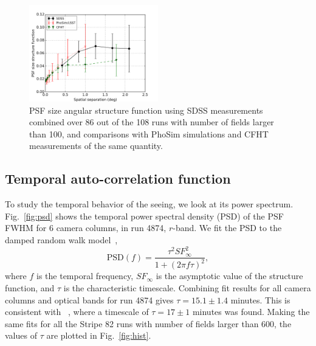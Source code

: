 \begin{figure}
\centering
\includegraphics[width=0.5\textwidth]{FIGURES/spatial.png}
\caption{PSF size angular structure function using SDSS measurements
  combined over 86 out of the 108 runs with number of fields larger
  than 100, and comparisons with PhoSim simulations and CFHT
  measurements of the same quantity.
\label{fig:spatial}}
\end{figure}

\subsection{Temporal auto-correlation function}

To study the temporal behavior of the seeing, we look at its
 power spectrum.
Fig.~\ref{fig:psd} shows the temporal power spectral density (PSD) of the
PSF FWHM for 6 camera columns, in run 4874, $r$-band.
We fit the PSD to the damped random walk model~\citep{zeljkoBook},
\begin{equation}
\textrm{PSD}(f) = \frac{\tau^2 SF^2_{\infty}}{1+(2\pi f \tau)^2},
\end{equation}
where $f$ is the temporal frequency, $SF_{\infty}$ is the asymptotic
value of the structure function, and $\tau$ is the
characteristic timescale.
Combining fit results for all camera columns and optical bands for run 4874
gives $\tau = 15.1 \pm 1.4$ minutes.
This is consistent with ~\cite{Racine1996}, where a timescale of 
$\tau = 17 \pm 1$ minutes was found.
Making the same fits for all the Stripe 82 runs with number of fields
larger than 600, the values of $\tau$ are plotted in Fig.~\ref{fig:hist}.


